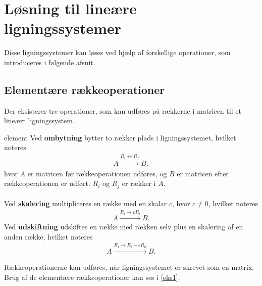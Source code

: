 \newpage
\section{Løsning til lineære ligningssystemer}
%
Disse ligningssystemer kan løses ved hjælp af forskellige operationer,
som introduceres i følgende afsnit.
%
\subsection{Elementære rækkeoperationer}
Der eksisterer tre operationer, som kan udføres på rækkerne i matricen til et lineært ligningssystem.
%
\begin{defn}{}{element}
Ved \textbf{ombytning} bytter to rækker plads i ligningssystemet, hvilket noteres
\begin{align*}
A \xrightarrow{R_i \leftrightarrow R_j} B, 
\end{align*}
hvor $A$ er matricen før rækkeoperationen udføres, og $B$ er matricen efter rækkeoperationen er udført. 
$R_i$ og $R_j$ er rækker i $A$.\\\\
Ved \textbf{skalering} multipliceres en række med en skalar $c$, hvor $c \neq 0$, hvilket noteres
\begin{align*}
A \xrightarrow{R_i \rightarrow cR_i} B.
\end{align*}
Ved \textbf{udskiftning} udskiftes en række med rækken selv plus en skalering af en anden række, hvilket noteres
\begin{align*}
A \xrightarrow{R_i \rightarrow R_i + cR_h} B.
\end{align*}
%
\end{defn}
\noindent
Rækkeoperationerne kan udføres, når ligningssystemet er skrevet som en matrix. Brug af de elementære rækkeoperationer kan ses i \ref{eks1}.
\\
%
%
